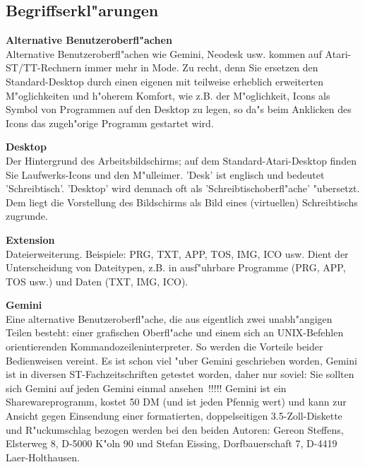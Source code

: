 \begin{appendix}

%
\setcounter{chapter}{1}
\chapter{Begriffserkl"arungen}  
  

{\bf Alternative Benutzeroberfl"achen} \\
Alternative Benutzeroberfl"achen wie Gemini, Neodesk usw. kommen 
auf Atari-ST/TT-Rechnern immer mehr in Mode. Zu recht, denn
Sie ersetzen den Standard-Desktop durch einen eigenen mit 
teilweise erheblich erweiterten M"oglichkeiten und h"oherem Komfort, 
wie z.B. der M"oglichkeit, Icons als Symbol von Programmen auf den 
Desktop zu legen, so da"s beim Anklicken des Icons das zugeh"orige 
Programm gestartet wird. 

{\bf Desktop} \\ 
Der Hintergrund des Arbeitsbildschirms; auf dem 
Standard-Atari-Desktop finden Sie Laufwerks-Icons und den 
M"ulleimer. 'Desk' ist englisch und bedeutet 'Schreibtisch'.
'Desktop' wird demnach oft als 'Schreibtischoberfl"ache' 
"ubersetzt. Dem liegt die Vorstellung des Bildschirms als 
Bild eines (virtuellen) Schreibtischs zugrunde.

{\bf Extension} \\
 
Dateierweiterung. Beispiele: PRG, TXT, APP, TOS, IMG, ICO usw.
Dient der Unterscheidung von Dateitypen, z.B. in
ausf"uhrbare Programme (PRG, APP, TOS usw.) und Daten 
(TXT, IMG, ICO).

{\bf Gemini} \\ 
Eine alternative Benutzeroberfl"ache, die aus eigentlich zwei 
unabh"angigen Teilen besteht: einer grafischen Oberfl"ache und
einem sich an UNIX-Befehlen orientierenden 
Kommandozeileninterpreter. So werden die Vorteile beider 
Bedienweisen vereint. Es ist schon viel "uber Gemini geschrieben
worden, Gemini ist in diversen ST-Fachzeitschriften getestet 
worden, daher nur soviel: Sie sollten sich Gemini 
auf jeden Gemini einmal ansehen~!!!!! Gemini ist ein
Sharewareprogramm, kostet 50 DM (und ist jeden Pfennig wert) und 
kann zur Ansicht gegen Einsendung einer formatierten, doppelseitigen
3.5-Zoll-Diskette und R"uckumschlag bezogen werden bei den beiden 
Autoren: Gereon Steffens, Elsterweg 8, D-5000 K"oln 90 und
Stefan Eissing, Dorfbauerschaft 7, D-4419 Laer-Holthausen.


\end{appendix}
